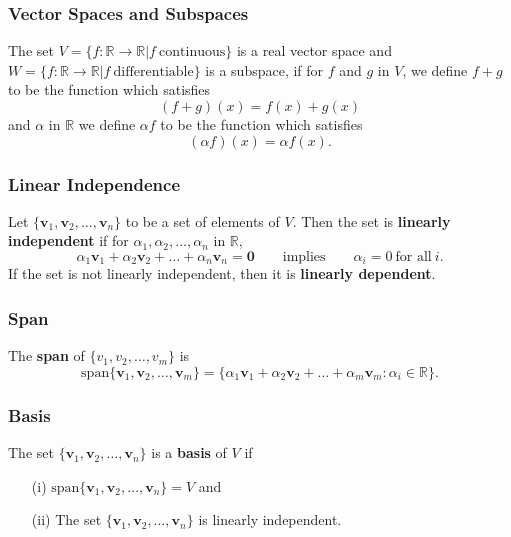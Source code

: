 \documentclass{beamer}
\begin{document}
\begin{frame}
\frametitle{Vector Spaces and Subspaces}
\begin{Example}
The set $V = \{f:\mathbb{R}\to\mathbb{R}| f\ \text{continuous}\}$ is a real vector space and $W = \{f:\mathbb{R}\to\mathbb{R}| f\ \text{differentiable}\}$ is a subspace, if for $f$ and $g$ in $V$, we define $f + g$ to be the function which satisfies 
$$
(f + g)(x) = f(x) + g(x)
$$
and $\alpha$ in $\mathbb{R}$ we define $\alpha f$ to be the function which satisfies 
$$
(\alpha f)(x) = \alpha f(x).
$$
\end{Example}
\end{frame}

\begin{frame}
\frametitle{Linear Independence}
\begin{Definition}
Let $\{{\boldsymbol v_1}, {\boldsymbol v_2},\ldots, {\boldsymbol v_n}\}$ to be a set of elements of $V$. Then the set is {\bf linearly independent} if for $\alpha_1, \alpha_2,\ldots, \alpha_n$ in $\mathbb{R}$, 
$$
\alpha_1 {\boldsymbol v_1} + \alpha_2 {\boldsymbol v_2}+\ldots + \alpha_n {\boldsymbol v_n} = {\boldsymbol 0} \qquad\text{implies}\qquad \alpha_i = 0\ \text{for all}\ i.
$$
If the set is not linearly independent, then it is {\bf linearly dependent}. 
\end{Definition}

\end{frame}

\begin{frame}
\frametitle{Span}
\begin{Definition}
The {\bf span} of $\{v_1, v_2,\ldots, v_m\}$ is 
$$
\text{span}\{{\boldsymbol v_1}, {\boldsymbol v_2},\ldots, {\boldsymbol v_m}\} = \{\alpha_1{\boldsymbol v_1} + \alpha_2{\boldsymbol v_2} + \ldots + \alpha_m {\boldsymbol v_m} : \alpha_i\in\mathbb{R}\}.
$$
\end{Definition}
\end{frame}

\begin{frame}
\frametitle{Basis}
\begin{Definition}
The set $\{{\boldsymbol v_1}, {\boldsymbol v_2},\ldots, {\boldsymbol v_n}\}$ is a {\bf basis} of $V$ if
\begin{enumerate}
\item[(i)] $\text{span}\{{\boldsymbol v_1}, {\boldsymbol v_2},\ldots, {\boldsymbol v_n}\} = V$ and
\item[(ii)] The set $\{{\boldsymbol v_1}, {\boldsymbol v_2},\ldots, {\boldsymbol v_n}\}$ is linearly independent.
\end{enumerate}
\end{Definition}
\end{frame}
\end{document}
